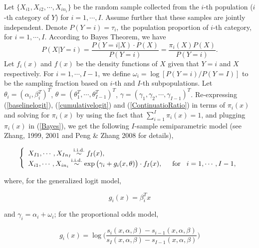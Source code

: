 \documentclass[12]{interact}
\theoremstyle{plain}%
\theoremstyle{definition}
\theoremstyle{remark}
\begin{document}
Let $\{X_{i1}, X_{i2}, \cdots, X_{in_i}\}$ be the random sample collected from the $i$-th population ($i$-th category of $Y$) for $ i = 1, \cdots, I $. Assume further that these samples are jointly independent. Denote $P(Y =i)=\tau_i$, the population proportion of $i$-th category,  for $i=1, \cdots, I$. According to Bayes Theorem, we have
\begin{equation}
	P(X|Y =i)=\frac{P(Y =i|X) \cdot P(X)} {P(Y=i)}=\frac{\pi_i(X)P(X)}{P(Y=i)}. \label{Bayes}
\end{equation}
Let $f_i(x)$ and $f(x)$ be the density functions of $X$ given that $Y=i$ and $X$ respectively. For $i=1, \cdots, I-1$, we define $\omega_i=\log[P(Y=i)/P(Y=I)]$ to be the sampling fraction based on $i$-th and $I$-th subpopulations. Let $\theta_i=(\alpha_i,\beta_i^T)^T$, $\theta=(\theta_1^T, \cdots, \theta_{I-1}^T)^T$,
$\gamma=(\gamma_1, \gamma_2, \cdots, \gamma_{I-1})^T$. Re-expressing (\ref{baselinelogit}), (\ref{cumulativelogit}) and (\ref{ContinuatioRatio}) in terms of $\pi_i(x)$ and solving for $\pi_i(x)$ by using the fact that $\sum_{i=1}^I \pi_i(x)=1$, and plugging $\pi_i(x)$ in (\ref{Bayes}), we get the following $I$-sample semiparametric model (see Zhang, 1999, 2001 and Peng \& Zhang 2008 for details),

\begin{equation}
	\left\{ \begin{array}{llll}
		$$X_{I1}, \cdots, X_{In_I} \stackrel{\mathrm{ i.i.d.}}{\sim}f_{I}(x),\hspace{1.in}$$\\
		$$X_{i1}, \cdots, X_{in_i} \stackrel{\mathrm{ i.i.d.}}
		{\sim} \exp\big(\gamma_i+g_i(x,\theta)\big)\cdot f_I(x),
		\hspace{5mm}\mbox{for}\hspace{3mm} i = 1, \cdots, I-1,$$
	\end{array}\right.
	\label{RetrospectivePLR}
\end{equation}

\noindent where, for the generalized logit model,

\begin{equation}
	g_i(x) = \beta_i^T x \label{gfunction_GL}
\end{equation}

and $\gamma_i=\alpha_i + \omega_i$; for the proportional odds model,

\begin{equation}
	g_i(x) = \log\Big(\frac{s_i(x,\alpha,\beta)-s_{i-1}(x,\alpha, \beta)}{s_I(x, \alpha, \beta)-s_{I-1}(x,\alpha, \beta)}\Big)\label{gfunctionPO}
\end{equation}
\end{document}
